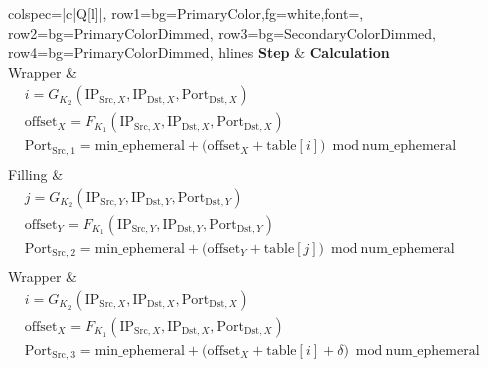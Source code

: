 \documentclass[twocolumn]{report}
\begin{document}
\begin{center}
	\begin{adjustbox}{max width=0.95\columnwidth}
		\begin{tblr}{
			colspec={|c|Q[l]|},
			row{1}={bg=PrimaryColor,fg=white,font=\bfseries},
			row{2}={bg=PrimaryColorDimmed},
			row{3}={bg=SecondaryColorDimmed},
			row{4}={bg=PrimaryColorDimmed},
			hlines
			}
			\textbf{Step} & \textbf{Calculation} \\

			Wrapper       &
			\(
			\begin{aligned}
				 & i = G_{K_2}(\text{IP}_{\text{Src},X}, \text{IP}_{\text{Dst},X}, \text{Port}_{\text{Dst},X})                                   \\
				 & \text{offset}_X = F_{K_1}(\text{IP}_{\text{Src},X}, \text{IP}_{\text{Dst},X}, \text{Port}_{\text{Dst},X})                     \\
				 & \text{Port}_{\text{Src},1} = \text{min\_ephemeral} + \bigl(\text{offset}_X + \text{table}[i]\bigr)\bmod \text{num\_ephemeral} \\
			\end{aligned}
			\)                                   \\

			Filling       &
			\(
			\begin{aligned}
				 & j = G_{K_2}(\text{IP}_{\text{Src},Y}, \text{IP}_{\text{Dst},Y}, \text{Port}_{\text{Dst},Y})                                   \\
				 & \text{offset}_Y = F_{K_1}(\text{IP}_{\text{Src},Y}, \text{IP}_{\text{Dst},Y}, \text{Port}_{\text{Dst},Y})                     \\
				 & \text{Port}_{\text{Src},2} = \text{min\_ephemeral} + \bigl(\text{offset}_Y + \text{table}[j]\bigr)\bmod \text{num\_ephemeral} \\
			\end{aligned}
			\)                                   \\

			Wrapper       &
			\(
			\begin{aligned}
				 & i = G_{K_2}(\text{IP}_{\text{Src},X}, \text{IP}_{\text{Dst},X}, \text{Port}_{\text{Dst},X})                                             \\
				 & \text{offset}_X = F_{K_1}(\text{IP}_{\text{Src},X}, \text{IP}_{\text{Dst},X}, \text{Port}_{\text{Dst},X})                               \\
				 & \text{Port}_{\text{Src},3} = \text{min\_ephemeral} + \bigl(\text{offset}_X + \text{table}[i] + \delta \bigr)\bmod \text{num\_ephemeral} \\
			\end{aligned}
			\)                                   \\
		\end{tblr}
	\end{adjustbox}
\end{center}
\end{document}
